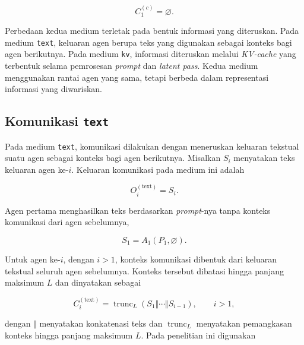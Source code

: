 \begin{equation}
    C_1^{(c)}=\varnothing.
    \label{eq:agent-initial-context}
\end{equation}

Perbedaan kedua medium terletak pada bentuk informasi yang diteruskan.
Pada medium \texttt{text}, keluaran agen berupa teks yang digunakan
sebagai konteks bagi agen berikutnya. Pada medium \texttt{kv},
informasi diteruskan melalui \textit{KV-cache} yang terbentuk selama
pemrosesan \textit{prompt} dan \textit{latent pass}. Kedua medium
menggunakan rantai agen yang sama, tetapi berbeda dalam representasi
informasi yang diwariskan.

\subsection{Komunikasi \texttt{text}}

\label{subsec:komunikasi-text}

Pada medium \texttt{text}, komunikasi dilakukan dengan meneruskan
keluaran tekstual suatu agen sebagai konteks bagi agen berikutnya.
Misalkan $S_i$ menyatakan teks keluaran agen ke-$i$. Keluaran
komunikasi pada medium ini adalah

\begin{equation}
    O_i^{(\text{text})}=S_i.
    \label{eq:text-output}
\end{equation}

Agen pertama menghasilkan teks berdasarkan \textit{prompt}-nya tanpa
konteks komunikasi dari agen sebelumnya,

\begin{equation}
    S_1
    =
    A_1\left(P_1,\varnothing\right).
    \label{eq:text-first-agent}
\end{equation}

Untuk agen ke-$i$, dengan $i>1$, konteks komunikasi dibentuk dari
keluaran tekstual seluruh agen sebelumnya. Konteks tersebut dibatasi
hingga panjang maksimum $L$ dan dinyatakan sebagai

\begin{equation}
    C_i^{(\text{text})}
    =
    \operatorname{trunc}_{L}
    \left(
        S_1\Vert\cdots\Vert S_{i-1}
    \right),
    \qquad i>1,
    \label{eq:text-context}
\end{equation}

dengan $\Vert$ menyatakan konkatenasi teks dan
$\operatorname{trunc}_{L}$ menyatakan pemangkasan konteks hingga
panjang maksimum $L$. Pada penelitian ini digunakan

